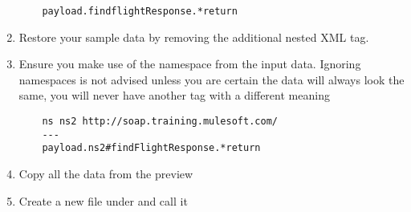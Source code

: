 \begin{enumerate}[resume*]
  \begin{lstlisting}
    payload.findflightResponse.*return
  \end{lstlisting}
\item Restore your sample data by removing the additional nested  XML tag.
\item Ensure you make use of the namespace from the input data.  Ignoring namespaces is not advised unless you are certain the data will always look the same, you will never have another  tag with a different meaning
  \begin{lstlisting}
    ns ns2 http://soap.training.mulesoft.com/
    ---
    payload.ns2#findFlightResponse.*return
  \end{lstlisting}
\item Copy all the data from the preview
\item Create a new file under  and call it 
\end{enumerate}

